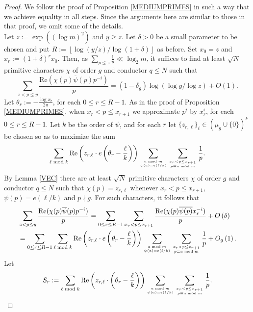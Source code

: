 \documentclass[12pt]{amsart}
\theoremstyle{definition}
\numberwithin{equation}{section}
\renewcommand{\bar}{\overline}
\begin{document}
\begin{proof}
We follow the proof of Proposition \ref{MEDIUMPRIMES} in such a way that we achieve equality in all steps. Since the arguments here are similar to those in that proof, we omit some of the details. \\
Let $z := \exp\left((\log m)^2\right)$ and $y \geq z$. Let $\delta>0$ be a small parameter to be chosen and put $R := \left\lfloor \log(y/z)/\log(1+\delta)\right \rfloor$ as before. Set $x_0=z$ and $x_r := (1+\delta)^r x_0$. Then, as $\sum_{p \leq z} \frac{1}{p} \ll \log_2 m$, it suffices to find at least $\sqrt{N}$ primitive characters $\chi$ of order $g$ and conductor $q\leq N$ such that 
\begin{equation} \label{REST}
\sum_{z < p \leq y} \frac{\text{Re}(\chi(p)\bar{\psi}(p)p^{-i})}{p} = (1-\delta_g) \log(\log y/\log z) + O(1).
\end{equation}
Let $\theta_r := -\frac{\log x_r}{2\pi}$, for each $0 \leq r \leq R-1$. As in the proof of Proposition \ref{MEDIUMPRIMES}, when $x_r < p \leq x_{r+1}$ we approximate $p^i$ by $x_r^i$, for each $0 \leq r \leq R-1$. Let $k$ be the order of $\psi$, and for each $r$ let $\{z_{r,\ell}\}_{\ell} \in (\mu_g \cup \{0\})^k$ be chosen so as to maximize the sum
\begin{equation*}
\sum_{\ell \bmod k} \text{Re}\left(z_{r,\ell} \cdot e\left(\theta_r-\frac{\ell}{k}\right)\right)\sum_{a \bmod m \atop \psi(a) =e(\ell/k)} \sum_{x_r < p \leq x_{r+1} \atop p \equiv a \bmod m} \frac{1}{p}.
\end{equation*}
By Lemma \ref{VEC} there are at least $\sqrt{N}$ primitive characters $\chi$ of order $g$ and conductor $q\leq N$ such that $\chi(p) = z_{r,\ell}$ whenever  $x_r < p \leq x_{r+1}$, $\psi(p) = e\left(\ell/k\right)$ and $p\nmid g$. For such characters, it follows that
\begin{align*}
&\sum_{z < p \leq y} \frac{\text{Re}(\chi(p)\bar{\psi}(p)p^{-i})}{p} = \sum_{0 \leq r \leq R-1} \sum_{x_r < p \leq x_{r+1}} \frac{\text{Re}(\chi(p)\bar{\psi(p)} x_r^{-i})}{p} + O\left(\delta\right) \\
&= \sum_{0 \leq r \leq R-1}\sum_{\ell \bmod k} \text{Re}\left(z_{r,\ell} \cdot e\left(\theta_r-\frac{\ell}{k}\right)\right)\sum_{a \bmod m \atop \psi(a) =e(\ell/k)} \sum_{x_r < p \leq x_{r+1} \atop p \equiv a \bmod m} \frac{1}{p} + O_{g}\left(1\right).
\end{align*}
Let 
$$S_r:= \sum_{\ell \bmod k} \text{Re}\left(z_{r,\ell} \cdot\left(\theta_r-\frac{\ell}{k}\right)\right)\sum_{a \bmod m \atop \psi(a) =e(\ell/k)} \sum_{x_r < p \leq x_{r+1} \atop p \equiv a \bmod m} \frac{1}{p}.$$

\end{proof}
\end{document}
